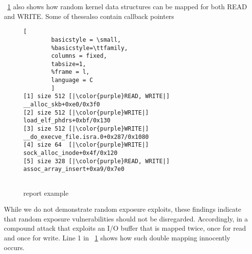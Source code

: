 \DIFdelbegin {}\DIFdelend \DIFaddbegin {}\DIFaddend ~\ref{fig:dkasan-report} also shows how random kernel data structures can be mapped for both READ and WRITE. Some of these\DIFaddbegin {}\DIFaddend also contain callback pointers\DIFdelbegin {}\DIFdelend \DIFaddbegin {}\DIFaddend 

%
\begin{figure}[t]
\begin{adjustbox}{width=0.9\linewidth}
        \begin{lstlisting}[
        basicstyle = \small,
        %basicstyle=\ttfamily,
        columns = fixed,
        tabsize=1,
        %frame = l,
        language = C
        ]
[1] size 512 [|\color{purple}READ, WRITE|] __alloc_skb+0xe0/0x3f0
[2] size 512 [|\color{purple}WRITE|] load_elf_phdrs+0xbf/0x130
[3] size 512 [|\color{purple}WRITE|] __do_execve_file.isra.0+0x287/0x1080
[4] size 64  [|\color{purple}WRITE|] sock_alloc_inode+0x4f/0x120
[5] size 328 [|\color{purple}READ, WRITE|] assoc_array_insert+0xa9/0x7e0
        
\end{lstlisting}
\end{adjustbox}
        \caption{\dkasan report example\DIFdelbeginFL {}\DIFdelendFL }
        \label{fig:dkasan-report}
\end{figure}

While we do not demonstrate random exposure exploits, these findings indicate that random exposure vulnerabilities should not be disregarded. Accordingly, in \DIFdelbegin {}\DIFdelend \DIFaddbegin {}\DIFaddend a compound attack that exploits an I/O buffer that is mapped twice, once for read and once for write. Line 1 in \DIFdelbegin {}\DIFdelend \DIFaddbegin {}\DIFaddend ~\ref{fig:dkasan-report}  shows how such double mapping innocently occurs.


